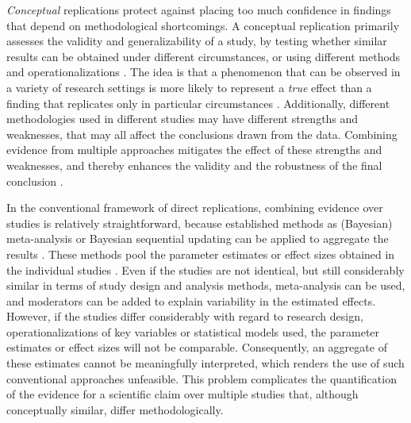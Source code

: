 \documentclass[review, 3p, authoryear]{elsarticle} %
\begin{document}
\emph{Conceptual} replications protect against placing too much confidence in findings that depend on methodological shortcomings.
A conceptual replication primarily assesses the validity and generalizability of a study, by testing whether similar results can be obtained under different circumstances, or using different methods and operationalizations \citep{nosek_scientific_2012}.
The idea is that a phenomenon that can be observed in a variety of research settings is more likely to represent a \emph{true} effect than a finding that replicates only in particular circumstances \citep{crandall_conceptual_2016}.
Additionally, different methodologies used in different studies may have different strengths and weaknesses, that may all affect the conclusions drawn from the data.
Combining evidence from multiple approaches mitigates the effect of these strengths and weaknesses, and thereby enhances the validity and the robustness of the final conclusion \citep{lawlor_triangulation_2017, lipton2003inference, mathison1988triangulate, munafo_robust_2018, nosek_scientific_2012}.

In the conventional framework of direct replications, combining evidence over studies is relatively straightforward, because established methods as (Bayesian) meta-analysis or Bayesian sequential updating can be applied to aggregate the results \citep{lipsey_wilson_2001, schonbrodt_sequential_2017, sutton_bayesian_meta2001}.
These methods pool the parameter estimates or effect sizes obtained in the individual studies \citep{cooper_handbook_2009}.
Even if the studies are not identical, but still considerably similar in terms of study design and analysis methods, meta-analysis can be used, and moderators can be added to explain variability in the estimated effects.
However, if the studies differ considerably with regard to research design, operationalizations of key variables or statistical models used, the parameter estimates or effect sizes will not be comparable.
Consequently, an aggregate of these estimates cannot be meaningfully interpreted, which renders the use of such conventional approaches unfeasible.
This problem complicates the quantification of the evidence for a scientific claim over multiple studies that, although conceptually similar, differ methodologically.
\end{document}
